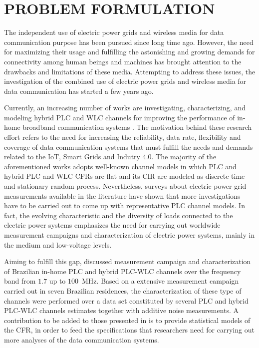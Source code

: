 \chapter{PROBLEM FORMULATION} \label{ProblemFormulation}

The independent use of electric power grids and wireless media for data communication purpose has been pursued since long time ago. However, the need for maximizing their usage and fulfilling the astonishing and growing demands for connectivity among human beings and machines has brought attention to the drawbacks and limitations of these media. Attempting to address these issues, the investigation of the combined use of electric power grids and wireless media for data communication has started a few years ago. 

Currently, an increasing number of works are investigating, characterizing, and modeling hybrid \ac{PLC} and \ac{WLC} channels for improving the performance of in-home broadband communication systems \cite{GalliUS,Canete:Model,Thiago:Characterization,thiago:hyb,thiago:hyb2}. The motivation behind these research effort refers to the need for increasing the reliability, data rate, flexibility and coverage of data communication systems that must fulfill the needs and demands related to the \ac{IoT}, Smart Grids and Indutry $4.0$.
The majority of the aforementioned works adopts well-known channel models in which \ac{PLC} and hybrid \ac{PLC} and \ac{WLC} \acp{CFR} are flat and its \ac{CIR} are modeled as discrete-time and stationary random process. Nevertheless, surveys about electric power grid measurements available in the literature have shown that more investigations have to be carried out to come up with representative \ac{PLC} channel models. In fact, the evolving characteristic and the diversity of loads connected to the electric power systems emphasizes the need for carrying out worldwide measurement campaigns and characterization of electric power systems, mainly in the medium and low-voltage levels. 

Aiming to fulfill this gap,  \cite{Thiago:Characterization,thiago:hyb,thiago:hyb2} discussed measurement campaign and characterization of Brazilian in-home \ac{PLC} and hybrid \ac{PLC}-\ac{WLC} channels over the frequency band from $1.7$ up to $100$~MHz. Based on a extensive measurement campaign carried out in seven Brazilian residences, the characterization of these type of channels were performed over a data set constituted by several \ac{PLC} and hybrid \ac{PLC}-\ac{WLC} channels estimates together with additive noise measurements. A contribution to be added to those presented in \cite{Thiago:Characterization,thiago:hyb} is to provide statistical models of the \ac{CFR}, in order to feed the specifications that researchers need for carrying out more analyses of the data communication systems.

